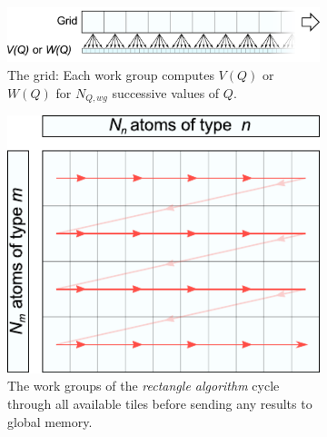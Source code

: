 \documentclass[11pt,twoside]{report}
\begin{document}
\begin{figure}[htbp]
	\centering
	\begin{subfigure}{0.7\textwidth}
	  \includegraphics[width=\textwidth]{img/kernel_grid.pdf}
	  \caption{The grid: Each work group computes $V(Q)$ or $W(Q)$ for $N_{Q,wg}$ successive values of $Q$.}
	  \label{fig:kernel_grid}	
	\end{subfigure}
	\vspace{5mm}
	\begin{subfigure}{0.5\textwidth}
	  \includegraphics[width=\textwidth]{img/kernel_wg_rect.pdf}
	  \caption{The work groups of the {\it rectangle algorithm} cycle through all available tiles before sending any results to global memory.}
	  \label{fig:kernel_wg_rect}	
	\end{subfigure}
	\hspace{5mm}
	\begin{subfigure}{0.42\textwidth}

\end{subfigure}
\end{figure}
\end{document}
